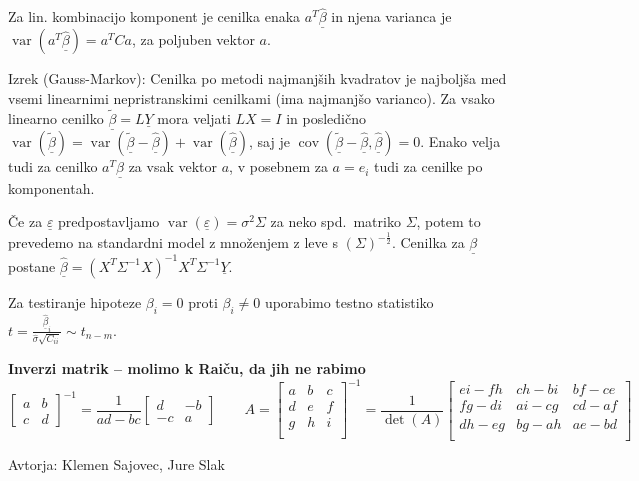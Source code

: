 \documentclass[11pt,a4paper]{amsart}
\theoremstyle{definition} %
\theoremstyle{plain} %
\newcommand{\Y}{\underline{Y}}
\newcommand{\ubeta}{\ensuremath{\underline{\beta}}}
\newcommand{\ueps}{\ensuremath{\underline{\varepsilon}}}
\DeclareMathOperator{\cov}{cov}
\DeclareMathOperator{\var}{var}
\begin{document}
Za lin. kombinacijo komponent je cenilka enaka $a^T\hat{\ubeta}$ in njena
varianca je $\var(a^T\hat{\ubeta}) = a^T C a$, za poljuben vektor $a$.

Izrek (Gauss-Markov): Cenilka po metodi najmanjših kvadratov je najboljša med
vsemi linearnimi nepristranskimi cenilkami (ima najmanjšo varianco). Za vsako
linearno cenilko $\tilde{\ubeta} = L\Y$ mora veljati $LX = I$ in posledično
$\var(\tilde{\ubeta}) = \var(\tilde{\ubeta} - \hat{\ubeta}) +
\var(\hat{\ubeta})$, saj je $\cov(\tilde{\ubeta} - \hat{\ubeta}, \hat{\ubeta}) =
0$. Enako velja tudi za cenilko $a^T\hat{\ubeta}$ za vsak vektor $a$, v posebnem
za $a = e_i$ tudi za cenilke po komponentah.

Če za $\ueps$ predpostavljamo $\var(\ueps) = \sigma^2\Sigma$ za neko spd.\
matriko $\Sigma$, potem to prevedemo na standardni model z množenjem z leve s
$(\Sigma)^{-\frac12}$. Cenilka za $\ubeta$ postane $\hat{\ubeta} =
(X^T\Sigma^{-1} X)^{-1}X^T\Sigma^{-1} \Y$.

Za testiranje hipoteze $\beta_i = 0$ proti $\beta_i \neq 0$ uporabimo testno
statistiko $t = \frac{\hat{\ubeta}_i}{\hat{\sigma} \sqrt{C_{ii}}} \sim t_{n-m}$.

\textbf{Inverzi matrik -- molimo k Raiču, da jih ne rabimo}
\[
  \begin{bmatrix}
    a & b \\ c & d
  \end{bmatrix}^{-1}
  =
  \frac{1}{ad - bc}
  \begin{bmatrix}
    d & -b \\ -c & a
  \end{bmatrix}
  \qquad A =
  \begin{bmatrix}
    a & b & c \\
    d & e & f \\
    g & h & i \\
  \end{bmatrix}^{-1}
 =
  \frac{1}{\det(A)}
\begin{bmatrix}
e i-f h & c h-b i & b f-c e \\
f g-d i & a i-c g & c d-a f \\
d h-e g & b g-a h & a e-b d \\
\end{bmatrix}
\]

\vfill \hfill Avtorja: Klemen Sajovec, Jure Slak
\end{document}
